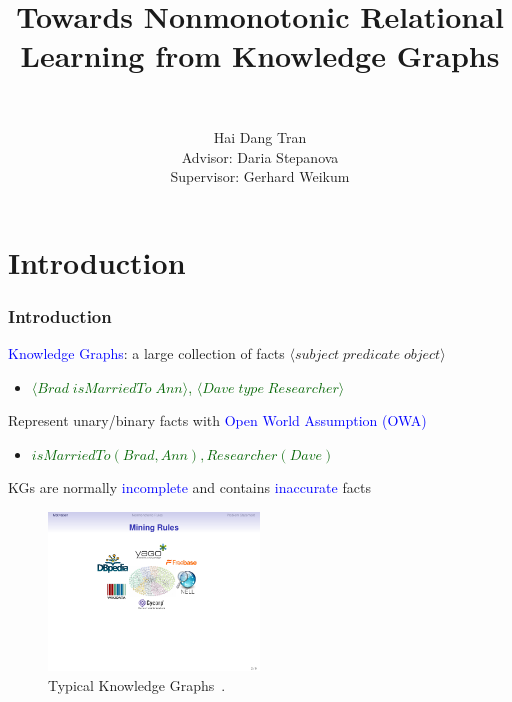 \documentclass{beamer}
\title{Towards Nonmonotonic Relational Learning from Knowledge Graphs}
\author[Stepanova]
 {
   \large{}\\
 }
\author[shortname]{Hai Dang Tran\\Advisor: Daria Stepanova\\Supervisor: Gerhard Weikum}
\institute[shortinst]{Max Planck Institute for Informatics, Saarbr\"{u}cken, Germany} %
\date[]{}
\newcommand{\tuple}[1]{\ensuremath{\langle#1\rangle}}
\newcommand{\bl}[1]{\textcolor{blue}{#1}}
\newcommand{\gr}[1]{\textcolor{darkgreen}{#1}}
\newcommand{\mi}[1]{\ensuremath{\mathit{#1}}}
\begin{document}
\frame{\titlepage}
\addtocounter{framenumber}{-1}


\section{Introduction}
\begin{frame}\frametitle{Introduction}
\medskip
\begin{itemize}
\small{\item \textcolor{blue}{Knowledge Graphs}: a large collection of facts $\tuple{subject\;predicate\;object}$
\begin{itemize}
\item[] \gr{$\tuple{\mi{Brad\;isMarriedTo\;Ann}}$, $\tuple{\mi{Dave \;type\;Researcher}}$}
\end{itemize}
\bigskip

\item Represent unary/binary facts with \textcolor{blue}{Open World Assumption (OWA)}
\begin{itemize}
\item[] \gr{$\mi{isMarriedTo(Brad,Ann), Researcher(Dave)}$}
\end{itemize}
\bigskip

\item KGs are normally \bl{incomplete} and contains \bl{inaccurate} facts
}
\end{itemize}

\begin{figure}[ht]
\includegraphics[width=0.5\textwidth]{kb}
\caption{Typical Knowledge Graphs~\cite{rumis}.}
\end{figure}


\end{frame}
\end{document}
